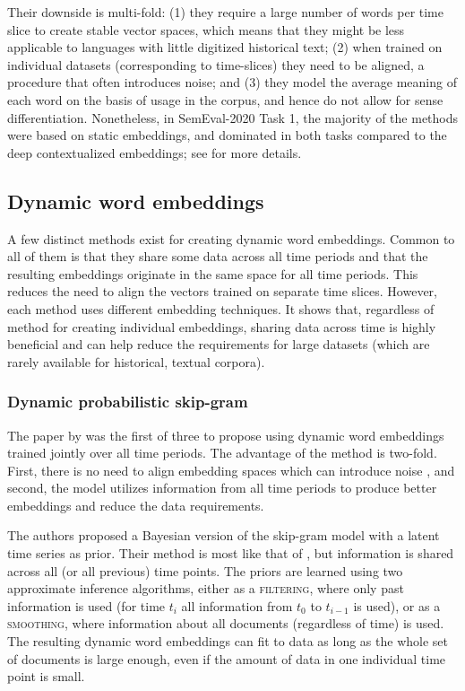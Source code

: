 \documentclass[output=paper]{langsci/langscibook}
\begin{document}
Their downside is multi-fold: (1) they require a large number of words per time slice to create stable vector spaces, which means that they might be less applicable to languages with little digitized historical text; (2) when trained on individual datasets (corresponding to time-slices) they need to be aligned, a procedure that often introduces noise; and (3) they model the average meaning of each word on the basis of usage in the corpus, and hence do not allow for sense differentiation.  Nonetheless, in SemEval-2020 Task 1, the majority of the methods were based on static embeddings, and dominated in both tasks compared to the deep contextualized embeddings; see \citet{schlechtweg-etal-2020-semeval} for more details.  


\subsection{Dynamic word embeddings}\label{subs:dynamicemb}
A few distinct methods exist for creating dynamic word embeddings. Common to all of them is that they share some data across all time periods and that the resulting embeddings originate in the same space for all time periods. This reduces the need to align the vectors trained on separate time slices. However, each method uses different embedding techniques. It shows that, regardless of method for creating individual embeddings, sharing data across time is highly beneficial and can help reduce the requirements for large datasets (which are rarely available for historical, textual corpora). 

\subsubsection{Dynamic probabilistic skip-gram}
The paper by \citet{bamler17} was the first of three to propose using dynamic word embeddings trained jointly over all time periods. The advantage of the method is two-fold. First, there is no need to align embedding spaces which can introduce noise \citep{dubossarsky2015bottom, dubossarsky-etal-2019-time}, and second, the model utilizes information from all time periods to produce better embeddings and reduce the data requirements. 

The authors proposed a Bayesian version of the skip-gram model \citep{barkan-probskipgram} with a latent time series as prior. Their method is most like that of \citet{kim-etal-2014-temporal}, but information is shared across all (or all previous) time points. The priors are learned using two approximate inference algorithms, either as a \textsc{filtering}, where only past information is used (for time $t_i$ all information from $t_0$ to $t_{i-1}$ is used), or as a \textsc{smoothing}, where information about all documents (regardless of time) is used. The resulting dynamic word embeddings can fit to data as long as the whole set of documents is large enough, even if the amount of data in one individual time point is small. 
\end{document}

